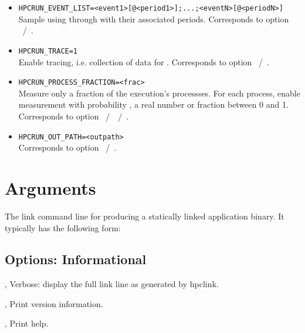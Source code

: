 \documentclass[english]{article}
\begin{document}
\begin{itemize}
\item \verb+HPCRUN_EVENT_LIST=<event1>[@<period1>];...;<eventN>[@<periodN>]+\\
  Sample using  through  with their associated periods.
  Corresponds to  option ~/~.

\item \verb+HPCRUN_TRACE=1+\\
  Enable tracing, i.e. collection of data for .
  Corresponds to  option ~/~.

\item \verb+HPCRUN_PROCESS_FRACTION=<frac>+\\
  Measure only a fraction  of the execution's processses.
  For each process, enable measurement with probability ,
  a real number or fraction between 0 and 1.
  Corresponds to  option ~/~~/~.

\item \verb+HPCRUN_OUT_PATH=<outpath>+\\
  Corresponds to  option ~/~.

\end{itemize}



\section{Arguments}

\begin{Description}
\item[\Arg{link-command}] The link command line for producing a statically linked application binary.
It typically has the following form:\\
\SP\SP\SP {}   
\end{Description}


\subsection{Options: Informational}

\begin{Description}

\item[\Opt{-v}, \Opt{--verbose}]
Verbose: display the full link line as generated by hpclink.

\item[\Opt{-V}, \Opt{--version}]
Print version information.

\item[\Opt{-h}, \Opt{--help}]
Print help.

\end{Description}
\end{document}
